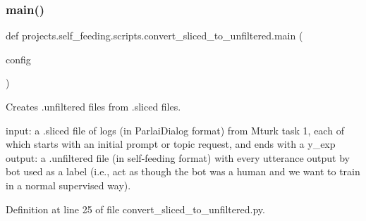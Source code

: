 \subsubsection{\texorpdfstring{main()}{main()}}
{\footnotesize\ttfamily def projects.\+self\+\_\+feeding.\+scripts.\+convert\+\_\+sliced\+\_\+to\+\_\+unfiltered.\+main (\begin{DoxyParamCaption}\item[{}]{config }\end{DoxyParamCaption})}

\begin{DoxyVerb}Creates .unfiltered files from .sliced files.

input: a .sliced file of logs (in ParlaiDialog format) from Mturk task 1, each of
    which starts with an initial prompt or topic request, and ends with a y_exp
output: a .unfiltered file (in self-feeding format) with every utterance output by
    bot used as a label (i.e., act as though the bot was a human and we want to
    train in a normal supervised way).
\end{DoxyVerb}
 

Definition at line 25 of file convert\+\_\+sliced\+\_\+to\+\_\+unfiltered.\+py.


